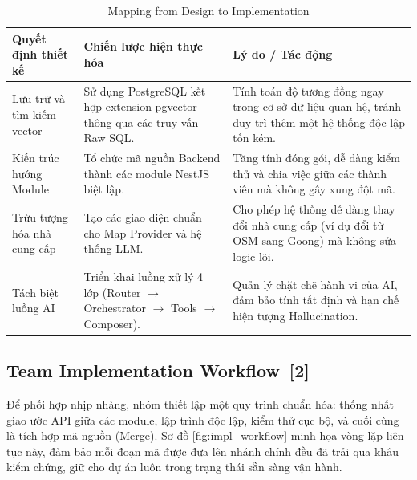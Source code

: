 \documentclass[12pt, a4paper]{article}
\begin{document}
\begin{table}[H]
    \centering
    \renewcommand{\arraystretch}{1.5}
    \begin{tabularx}{\textwidth}{|>{\raggedright\arraybackslash}p{3cm}|>{\raggedright\arraybackslash}p{5cm}|X|}
        \hline
        \textbf{Quyết định thiết kế} & \textbf{Chiến lược hiện thực hóa} & \textbf{Lý do / Tác động} \\
        \hline
        Lưu trữ và tìm kiếm vector & Sử dụng PostgreSQL kết hợp extension pgvector thông qua các truy vấn Raw SQL. & Tính toán độ tương đồng ngay trong cơ sở dữ liệu quan hệ, tránh duy trì thêm một hệ thống độc lập tốn kém. \\
        \hline
        Kiến trúc hướng Module & Tổ chức mã nguồn Backend thành các module NestJS biệt lập. & Tăng tính đóng gói, dễ dàng kiểm thử và chia việc giữa các thành viên mà không gây xung đột mã. \\
        \hline
        Trừu tượng hóa nhà cung cấp & Tạo các giao diện chuẩn cho Map Provider và hệ thống LLM. & Cho phép hệ thống dễ dàng thay đổi nhà cung cấp (ví dụ đổi từ OSM sang Goong) mà không sửa logic lõi. \\
        \hline
        Tách biệt luồng AI & Triển khai luồng xử lý 4 lớp (Router $\to$ Orchestrator $\to$ Tools $\to$ Composer). & Quản lý chặt chẽ hành vi của AI, đảm bảo tính tất định và hạn chế hiện tượng Hallucination. \\
        \hline
    \end{tabularx}
    \caption{Mapping from Design to Implementation}
    \label{tab:design_to_impl}
\end{table}

\subsection[Team Implementation Workflow]{Team Implementation Workflow \,{\normalfont\small\textcolor{cyan!70!black}{[2]}}}

Để phối hợp nhịp nhàng, nhóm thiết lập một quy trình chuẩn hóa: thống nhất giao ước API giữa các module, lập trình độc lập, kiểm thử cục bộ, và cuối cùng là tích hợp mã nguồn (Merge). Sơ đồ \ref{fig:impl_workflow} minh họa vòng lặp liên tục này, đảm bảo mỗi đoạn mã được đưa lên nhánh chính đều đã trải qua khâu kiểm chứng, giữ cho dự án luôn trong trạng thái sẵn sàng vận hành.
\end{document}
